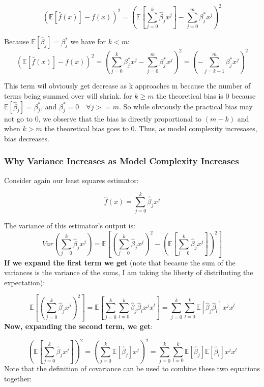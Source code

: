 \documentclass[12pt]{article}
\begin{document}
\[\left(\mathbb{E}[\hat{f}(x)] - f(x)\right)^2 = \left(\mathbb{E}\left[\sum_{j=0}^k\hat{\beta}_j x^j\right] - \sum_{j=0}^m  \beta_j^*x^j\right)^2\]

Because \(\mathbb{E}[\hat{\beta}_j] = \beta_j^*\) we have for \(k < m\):
\[\left(\mathbb{E}[\hat{f}(x)] - f(x)\right)^2  = \left(\sum_{j=0}^k  \beta_j^*x^j - \sum_{j=0}^m  \beta_j^*x^j\right)^2 = \left(- \sum_{j=k+1}^m  \beta_j^*x^j\right)^2\]

This term wil obviously get decrease as k approaches m because the number of terms being summed over will shrink. for \(k \geq m\) the theoretical bias is 0 because \(\mathbb{E}[\hat{\beta}_j ] = \beta_j^*\), and \(\beta_j^* = 0 \quad \forall j >=m\). So while obviously the practical bias may not go to 0, we observe that the bias is directly proportional to \((m - k)\) and when \(k > m\) the theoretical bias goes to 0. Thus, as model complexity incresases,  bias decreases. \\
\subsubsection{Why Variance Increases as Model Complexity Increases}

Consider again our least squares estimator:

\[\hat{f}(x) = \sum_{j=0}^k \hat{\beta}_j x^j\]

The variance of  this estimator's output is: 
\[
Var\left(\sum_{j=0}^k \hat{\beta}_j x^j\right) = \mathbb{E}\left[\left(\sum_{j=0}^k \hat{\beta}_j x^j\right)^2- \left(\mathbb{E}\left[\sum_{j=0}^k \hat{\beta}_j x^j\right]\right)^2\right] 
\]
\textbf{If we expand the first term we get} (note that becasue the sum of the variances is the variance of the sums, I am taking the liberty of distributing the expectation):

\[
\mathbb{E}\left[\left(\sum_{j=0}^k \hat{\beta}_j x^j\right)^2\right] = \mathbb{E}\left[\sum_{j=0}^k \sum_{l=0}^k \hat{\beta}_j \hat{\beta}_l x^j x^l\right] = \sum_{j=0}^k \sum_{l=0}^k \mathbb{E}\left[\hat{\beta}_j \hat{\beta}_l\right] x^j x^l
\]
\textbf{Now, expanding the second term, we get}:

\[
\left( \mathbb{E} \left[ \sum_{j=0}^{k} \hat{\beta}_j x^j \right] \right)^2 
= \left( \sum_{j=0}^{k} \mathbb{E} \left[ \hat{\beta}_j \right] x^j \right)^2
= \sum_{j=0}^{k} \sum_{l=0}^{k} \mathbb{E} \left[ \hat{\beta}_j \right] \mathbb{E} \left[ \hat{\beta}_l \right] x^j x^l
\]
Note that the definition of covariance can be used to combine these two equations together:
\end{document}
